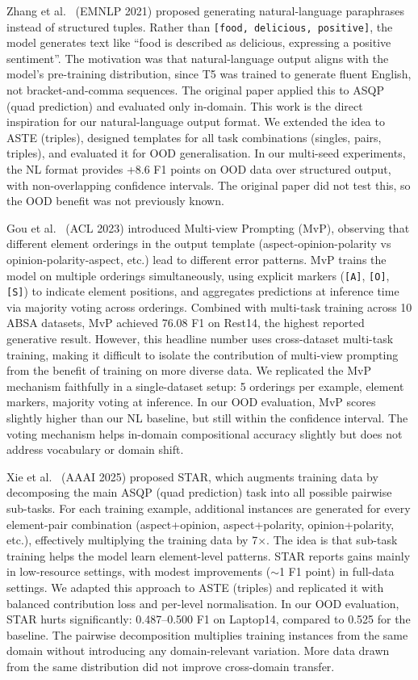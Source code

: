 \documentclass[12pt,a4paper]{report}
\begin{document}
Zhang et al.~\cite{zhang2021aspect} (EMNLP 2021) proposed generating natural-language paraphrases instead of structured tuples. Rather than \texttt{[food, delicious, positive]}, the model generates text like ``food is described as delicious, expressing a positive sentiment''. The motivation was that natural-language output aligns with the model's pre-training distribution, since T5 was trained to generate fluent English, not bracket-and-comma sequences. The original paper applied this to ASQP (quad prediction) and evaluated only in-domain. This work is the direct inspiration for our natural-language output format. We extended the idea to ASTE (triples), designed templates for all task combinations (singles, pairs, triples), and evaluated it for OOD generalisation. In our multi-seed experiments, the NL format provides +8.6 F1 points on OOD data over structured output, with non-overlapping confidence intervals. The original paper did not test this, so the OOD benefit was not previously known.

Gou et al.~\cite{gou2023mvp} (ACL 2023) introduced Multi-view Prompting (MvP), observing that different element orderings in the output template (aspect-opinion-polarity vs opinion-polarity-aspect, etc.) lead to different error patterns. MvP trains the model on multiple orderings simultaneously, using explicit markers (\texttt{[A]}, \texttt{[O]}, \texttt{[S]}) to indicate element positions, and aggregates predictions at inference time via majority voting across orderings. Combined with multi-task training across 10 ABSA datasets, MvP achieved 76.08 F1 on Rest14, the highest reported generative result. However, this headline number uses cross-dataset multi-task training, making it difficult to isolate the contribution of multi-view prompting from the benefit of training on more diverse data. We replicated the MvP mechanism faithfully in a single-dataset setup: 5 orderings per example, element markers, majority voting at inference. In our OOD evaluation, MvP scores slightly higher than our NL baseline, but still within the confidence interval. The voting mechanism helps in-domain compositional accuracy slightly but does not address vocabulary or domain shift.

Xie et al.~\cite{xie2025star} (AAAI 2025) proposed STAR, which augments training data by decomposing the main ASQP (quad prediction) task into all possible pairwise sub-tasks. For each training example, additional instances are generated for every element-pair combination (aspect+opinion, aspect+polarity, opinion+polarity, etc.), effectively multiplying the training data by 7$\times$. The idea is that sub-task training helps the model learn element-level patterns. STAR reports gains mainly in low-resource settings, with modest improvements ($\sim$1 F1 point) in full-data settings. We adapted this approach to ASTE (triples) and replicated it with balanced contribution loss and per-level normalisation. In our OOD evaluation, STAR hurts significantly: 0.487--0.500 F1 on Laptop14, compared to 0.525 for the baseline. The pairwise decomposition multiplies training instances from the same domain without introducing any domain-relevant variation. More data drawn from the same distribution did not improve cross-domain transfer.
\end{document}
